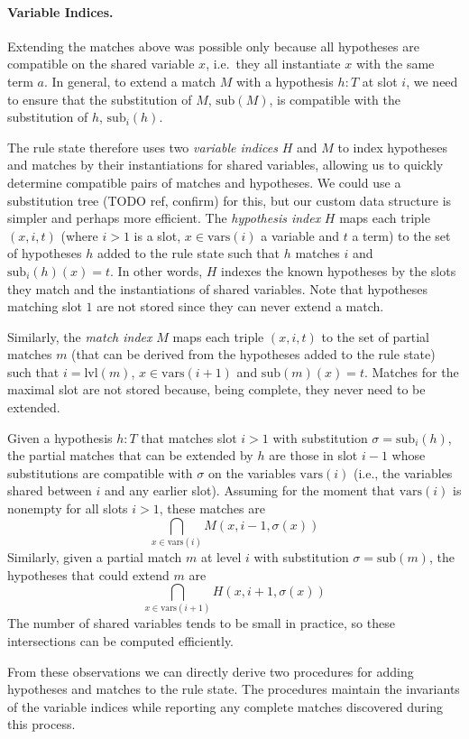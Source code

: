 \documentclass[runningheads]{llncs}
\newcommand{\vars}{\ensuremath{\mathrm{vars}}}
\newcommand{\sub}{\ensuremath{\mathrm{sub}}}
\newcommand{\lvl}{\ensuremath{\mathrm{lvl}}}
\begin{document}
\paragraph{Variable Indices.}
Extending the matches above was possible only because all hypotheses are compatible on the shared variable $x$, i.e.\ they all instantiate $x$ with the same term $a$.
In general, to extend a match $M$ with a hypothesis $h : T$ at slot $i$, we need to ensure that the substitution of $M$, $\sub(M)$, is compatible with the substitution of $h$, $\sub_{i}(h)$.

The rule state therefore uses two \emph{variable indices} $H$ and $M$ to index hypotheses and matches by their instantiations for shared variables, allowing us to quickly determine compatible pairs of matches and hypotheses.
We could use a substitution tree (TODO ref, confirm) for this, but our custom data structure is simpler and perhaps more efficient.
The \emph{hypothesis index} $H$ maps each triple $(x, i, t)$ (where $i > 1$ is a slot, $x ∈ \vars(i)$ a variable and $t$ a term) to the set of hypotheses $h$ added to the rule state such that $h$ matches $i$ and $\sub_{i}(h)(x) = t$.
In other words, $H$ indexes the known hypotheses by the slots they match and the instantiations of shared variables.
Note that hypotheses matching slot $1$ are not stored since they can never extend a match.

Similarly, the \emph{match index} $M$ maps each triple $(x, i, t)$ to the set of partial matches $m$ (that can be derived from the hypotheses added to the rule state) such that $i = \lvl(m) $, $x ∈ \vars(i + 1)$ and $\sub(m)(x) = t$.
Matches for the maximal slot are not stored because, being complete, they never need to be extended.

Given a hypothesis $h : T$ that matches slot $i > 1$ with substitution $σ = \sub_{i}(h)$, the partial matches that can be extended by $h$ are those in slot $i - 1$ whose substitutions are compatible with $σ$ on the variables $\vars(i)$ (i.e., the variables shared between $i$ and any earlier slot).
Assuming for the moment that $\vars(i)$ is nonempty for all slots $i > 1$, these matches are
\[
  \bigcap_{x \in \vars(i)} M(x, i-1, σ(x))
\]
Similarly, given a partial match $m$ at level $i$ with substitution $σ = \sub(m)$, the hypotheses that could extend $m$ are
\[
  \bigcap_{x \in \vars(i+1)} H(x, i+1, σ(x))
\]
The number of shared variables tends to be small in practice, so these intersections can be computed efficiently.

From these observations we can directly derive two procedures for adding hypotheses and matches  to the rule state.
The procedures maintain the invariants of the variable indices while reporting any complete matches discovered during this process.
\end{document}
